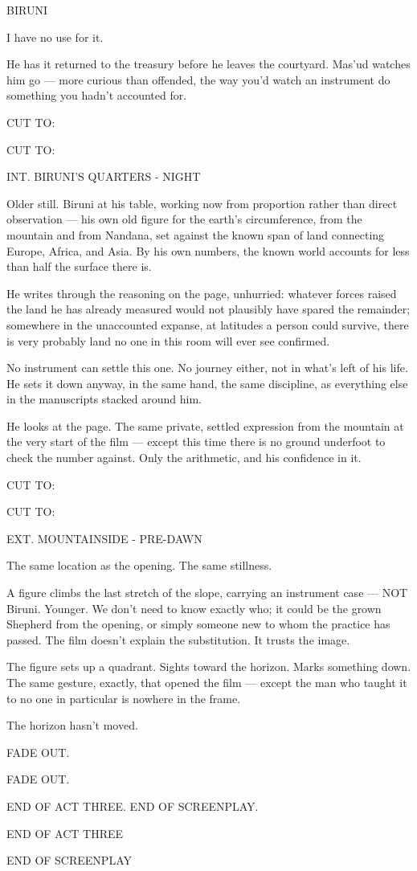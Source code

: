 \documentclass[12pt]{article}
\newcommand{\sceneheading}[1]{%
  \needspace{4\baselineskip}%
  \par\vspace{1\baselineskip}\noindent #1\par\vspace{0.6\baselineskip}%
}
\newcommand{\action}[1]{%
  \par\noindent #1\par\vspace{0.6\baselineskip}%
}
\newcommand{\transition}[1]{%
  \par\vspace{0.3\baselineskip}%
  \ifthenelse{\equal{#1}{FADE IN:}}%
    {\noindent #1\par}%
    {\noindent\hfill #1\par}%
  \vspace{0.6\baselineskip}%
}
\newcommand{\charcue}[1]{%
  \needspace{3\baselineskip}%
  \par\vspace{0.3\baselineskip}\noindent\hspace*{2.2in}#1\par%
}
\newenvironment{dialogue}{%
  \begin{list}{}{%
    \setlength{\leftmargin}{1.1in}%
    \setlength{\rightmargin}{1.6in}%
    \setlength{\listparindent}{0pt}%
    \setlength{\itemindent}{0pt}%
    \setlength{\parsep}{0pt}%
    \setlength{\itemsep}{0pt}%
    \setlength{\topsep}{0pt}%
  }\item[]%
}{%
  \end{list}\vspace{0.4\baselineskip}%
}
\newcommand{\actclose}[1]{%
  \par\vspace{1.5\baselineskip}\begin{center}#1\end{center}\vspace{1\baselineskip}%
}
\begin{document}
\charcue{BIRUNI}
\begin{dialogue}
I have no use for it.\\
\end{dialogue}
\action{He has it returned to the treasury before he leaves the courtyard. Mas'ud watches him go --- more curious than offended, the way you'd watch an instrument do something you hadn't accounted for.}
\transition{CUT TO:}
\sceneheading{INT. BIRUNI'S QUARTERS - NIGHT}
\action{Older still. Biruni at his table, working now from proportion rather than direct observation --- his own old figure for the earth's circumference, from the mountain and from Nandana, set against the known span of land connecting Europe, Africa, and Asia. By his own numbers, the known world accounts for less than half the surface there is.}
\action{He writes through the reasoning on the page, unhurried: whatever forces raised the land he has already measured would not plausibly have spared the remainder; somewhere in the unaccounted expanse, at latitudes a person could survive, there is very probably land no one in this room will ever see confirmed.}
\action{No instrument can settle this one. No journey either, not in what's left of his life. He sets it down anyway, in the same hand, the same discipline, as everything else in the manuscripts stacked around him.}
\action{He looks at the page. The same private, settled expression from the mountain at the very start of the film --- except this time there is no ground underfoot to check the number against. Only the arithmetic, and his confidence in it.}
\transition{CUT TO:}
\sceneheading{EXT. MOUNTAINSIDE - PRE-DAWN}
\action{The same location as the opening. The same stillness.}
\action{A figure climbs the last stretch of the slope, carrying an instrument case --- NOT Biruni. Younger. We don't need to know exactly who; it could be the grown Shepherd from the opening, or simply someone new to whom the practice has passed. The film doesn't explain the substitution. It trusts the image.}
\action{The figure sets up a quadrant. Sights toward the horizon. Marks something down. The same gesture, exactly, that opened the film --- except the man who taught it to no one in particular is nowhere in the frame.}
\action{The horizon hasn't moved.}
\transition{FADE OUT.}
\action{END OF ACT THREE. END OF SCREENPLAY.}
\actclose{END OF ACT THREE}

\clearpage
\thispagestyle{plain}
\begin{center}
END OF SCREENPLAY
\end{center}
\end{document}
